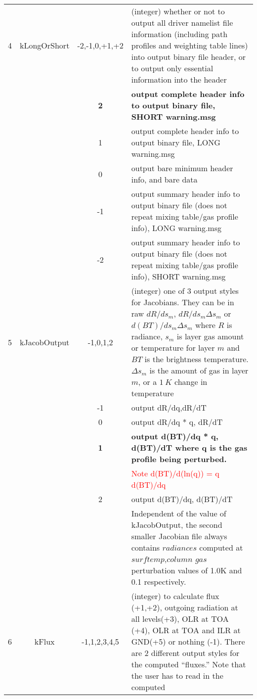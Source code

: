 \documentclass[12pt]{article}
\newlength{\colwidth}
\newlength{\colwidthshort}
\begin{document}
\begin{small}
\begin{longtable}{|c|c|c|p{\colwidthshort}|}
4  & {\sf kLongOrShort} &-2,-1,0,+1,+2    & (integer) whether or not to output all 
driver namelist file information (including path profiles and weighting table 
lines) into output binary file header, or to output only essential 
information into the header \\
   &  & {\bf 2}   & {\bf output complete header info to output binary file, SHORT warning.msg} \\
   &  & 1        & output complete header info to output binary file, LONG warning.msg \\
   &  & 0        & output bare minimum header info, and bare data \\
   &  & -1       & output summary header info to output binary file
                    (does not repeat mixing table/gas profile info), LONG warning.msg\\
   &  & -2       & output summary header info to output binary file
                    (does not repeat mixing table/gas profile info), SHORT warning.msg\\  \hline
5 & {\sf kJacobOutput} & -1,0,1,2 & (integer) one of 3 output styles for 
    Jacobians.  They can be in raw $dR/ds_{m}$, $dR/ds_{m} \Delta s_{m}$ or 
    $d(BT)/ds_{m} \Delta s_{m}$ where $R$ is radiance, $s_{m}$ is layer gas 
    amount or temperature for layer $m$ and $BT$ is the brightness 
    temperature.  $\Delta s_{m}$ is the amount of gas in layer $m$, or a 
    $1~K$ change in temperature \\
  &      & -1        & output dR/dq,dR/dT\\
  &      & 0         & output dR/dq * q, dR/dT\\
  &      & {\bf 1}   & {\bf output d(BT)/dq * q, d(BT)/dT
                       where q is the gas profile being perturbed.}\\ 
  &      &           & \textcolor{red}{Note d(BT)/d(ln(q)) = q d(BT)/dq} \\
  &      & 2         & output d(BT)/dq, d(BT)/dT \\
   & & & Independent of the value of kJacobOutput, the second smaller Jacobian
         file always contains $radiances$ computed at $surftemp$,$column$ $gas$
         perturbation values of 1.0K and 0.1 respectively.\\
  \hline
6 & {\sf kFlux}   & -1,1,2,3,4,5 & (integer) to calculate flux (+1,+2), 
    outgoing radiation at all levels(+3), OLR at TOA (+4), OLR at TOA and
    ILR at GND(+5) or nothing (-1). There are 2 different output styles for 
    the computed ``fluxes.'' Note that the user has to read in the computed 

\end{longtable}
\end{small}
\end{document}
